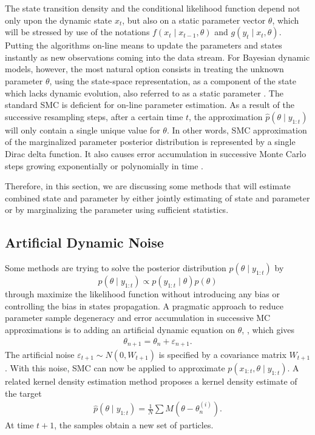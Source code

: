 The state transition density and the conditional likelihood function depend not only upon the dynamic state $x_t$, but also on a static parameter vector $\theta$, which will be stressed by use of the notations $f(x_t \mid x_{t-1},\theta)$ and $g(y_t\mid x_t,\theta)$. Putting the algorithms on-line means to update the parameters and states instantly as new observations coming into the data stream. For Bayesian dynamic models, however, the most natural option consists in treating the unknown parameter $\theta$, using the state-space representation, as a component of the state which lacks dynamic evolution, also referred to as a static parameter \citep{cappe2007overview}. The standard SMC is deficient for on-line parameter estimation. As a result of the successive resampling steps, after a certain time $t$, the approximation $\hat{p}(\theta\mid y_{1:t})$ will only contain a single unique value for $\theta$. In other words, SMC approximation of the marginalized parameter posterior distribution is represented by a single Dirac delta function. It also causes error accumulation in successive Monte Carlo steps growing exponentially or polynomially in time \citep{kantas2009overview}. 

Therefore, in this section, we are discussing some methods that will estimate combined state and parameter by either jointly estimating of state and parameter or by marginalizing the parameter using sufficient statistics. 





\subsection{Artificial Dynamic Noise}\label{ArtificialNoise}

Some methods are trying to solve the posterior distribution $p(\theta \mid y_{1:t})$ by 
\begin{equation}
p(\theta \mid y_{1:t}) \propto p(y_{1:t} \mid \theta ) p(\theta )
\end{equation}
through maximize the likelihood function without introducing any bias or controlling the bias in states propagation. A pragmatic approach to reduce parameter sample degeneracy and error accumulation in successive MC approximations is to adding an artificial dynamic equation on $\theta$, \citep{higuchi2001self, kitagawa1998self}, which gives
\begin{align*}
\theta_{n+1} = \theta_n+\varepsilon_{n+1}.
\end{align*}
The artificial noise $\varepsilon_{t+1}\sim N(0,W_{t+1})$ is specified by a covariance matrix $W_{t+1}$. With this noise, SMC can now be applied to approximate $p(x_{1:t},\theta\mid y_{1:t})$. A related kernel density estimation method proposes a kernel density estimate of the target \citep{liu2001combined} 
\begin{align*}
\hat{p}(\theta\mid y_{1:t}) = \frac{1}{N}\sum M\left(\theta-\theta_n^{(i)}\right). 
\end{align*} 
At time $t+1$, the samples obtain a new set of particles. 


